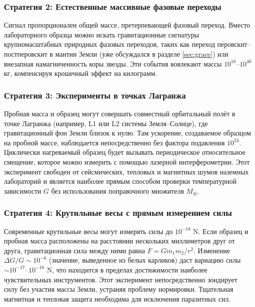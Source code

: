 \documentclass[12pt]{article}
\theoremstyle{remark}
\begin{document}
	\subsubsection*{Стратегия 2: Естественные массивные фазовые переходы}
	Сигнал пропорционален общей массе, претерпевающей фазовый переход. Вместо лабораторного образца можно искать гравитационные сигнатуры крупномасштабных природных фазовых переходов, таких как переход перовскит–постперовскит в мантии Земли (уже обсуждался в разделе \ref{sec:grace}) или внезапная намагниченность коры звезды. Эти события вовлекают массы $10^{18}$–$10^{40}$ кг, компенсируя крошечный эффект на килограмм.
	
	\subsubsection*{Стратегия 3: Эксперименты в точках Лагранжа}
	Пробная масса и образец могут совершать совместный орбитальный полёт в точке Лагранжа (например, L1 или L2 системы Земля–Солнце), где гравитационный фон Земли близок к нулю. Там ускорение, создаваемое образцом на пробной массе, наблюдается непосредственно без фактора подавления $10^{24}$. Циклически нагреваемый образец будет вызывать периодическое относительное смещение, которое можно измерить с помощью лазерной интерферометрии. Этот эксперимент свободен от сейсмических, тепловых и магнитных шумов наземных лабораторий и является наиболее прямым способом проверки температурной зависимости $G$ без использования поправочного множителя $M_\oplus$.
	
	\subsubsection*{Стратегия 4: Крутильные весы с прямым измерением силы}
	Современные крутильные весы могут измерять силы до $10^{-18}$ N. Если образец и пробная масса расположены на расстоянии нескольких миллиметров друг от друга, гравитационная сила между ними равна $F = G m_1 m_2 / r^2$. Изменение $\Delta G / G \sim 10^{-6}$ (значение, выведенное из белых карликов) даст вариацию силы $\sim 10^{-17}$–$10^{-18}$ N, что находится в пределах достижимости наиболее чувствительных инструментов. Этот эксперимент непосредственно зондирует силу без участия массы Земли, устраняя проблему нормировки. Тщательная магнитная и тепловая защита необходима для исключения паразитных сил.
	
\end{document}
